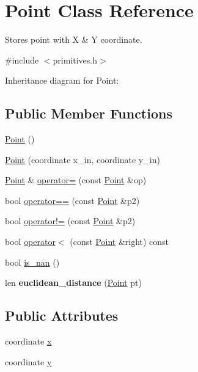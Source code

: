\hypertarget{classPoint}{}\section{Point Class Reference}
\label{classPoint}


Stores point with X \& Y coordinate.  




{\ttfamily \#include $<$primitives.\+h$>$}



Inheritance diagram for Point\+:
\subsection*{Public Member Functions}
\begin{DoxyCompactItemize}
\item 
\hyperlink{classPoint_ad92f2337b839a94ce97dcdb439b4325a}{Point} ()
\item 
\hyperlink{classPoint_af7373698b9fafc53b0a5d06e511642e1}{Point} (coordinate x\+\_\+in, coordinate y\+\_\+in)
\item 
\hyperlink{classPoint}{Point} \& \hyperlink{classPoint_a2e142edc132377fdc6873f6549daab2d}{operator=} (const \hyperlink{classPoint}{Point} \&op)
\item 
bool \hyperlink{classPoint_ac7bc64b9a683d5fb35780c739779f2fc}{operator==} (const \hyperlink{classPoint}{Point} \&p2)
\item 
bool \hyperlink{classPoint_ade5f3908ec0e412aea8c3e12f5d0e26f}{operator!=} (const \hyperlink{classPoint}{Point} \&p2)
\item 
bool \hyperlink{classPoint_a2d285a505e84d64a96974d5247e8ae7a}{operator$<$} (const \hyperlink{classPoint}{Point} \&right) const
\item 
bool \hyperlink{classPoint_a2bc8aed929f6be2b543ba2f26b8a5f72}{is\+\_\+nan} ()
\item 
\mbox{\label{classPoint_ad67dc97c8669077462b8b72492d68df0}} 
len {\bfseries euclidean\+\_\+distance} (\hyperlink{classPoint}{Point} pt)
\end{DoxyCompactItemize}
\subsection*{Public Attributes}
\begin{DoxyCompactItemize}
\item 
coordinate \hyperlink{classPoint_a2e5bf2da8d7f35ef2ca707ae5ec1929b}{x}
\item 
coordinate \hyperlink{classPoint_a4390d37c7ed19ad07212fc84df2fe26e}{y}
\end{DoxyCompactItemize}
